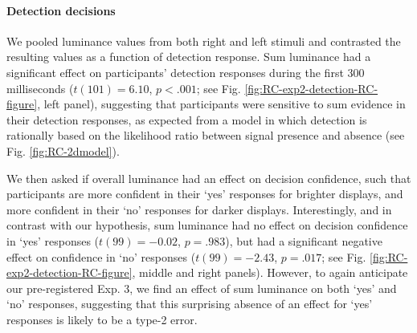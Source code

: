 \documentclass[12pt,twoside]{reedthesis}
\begin{document}
\hypertarget{e2-det-RC}{%
\paragraph*{Detection decisions}\label{e2-det-RC}}

We pooled luminance values from both right and left stimuli and contrasted the resulting values as a function of detection response. Sum luminance had a significant effect on participants' detection responses during the first 300 milliseconds (\(t(101) = 6.10\), \(p < .001\); see Fig. \ref{fig:RC-exp2-detection-RC-figure}, left panel), suggesting that participants were sensitive to sum evidence in their detection responses, as expected from a model in which detection is rationally based on the likelihood ratio between signal presence and absence (see Fig. \ref{fig:RC-2dmodel}).

We then asked if overall luminance had an effect on decision confidence, such that participants are more confident in their `yes' responses for brighter displays, and more confident in their `no' responses for darker displays. Interestingly, and in contrast with our hypothesis, sum luminance had no effect on decision confidence in `yes' responses (\(t(99) = -0.02\), \(p = .983\)), but had a significant negative effect on confidence in `no' responses (\(t(99) = -2.43\), \(p = .017\); see Fig. \ref{fig:RC-exp2-detection-RC-figure}, middle and right panels). However, to again anticipate our pre-registered Exp. 3, we find an effect of sum luminance on both `yes' and `no' responses, suggesting that this surprising absence of an effect for `yes' responses is likely to be a type-2 error.
\end{document}
